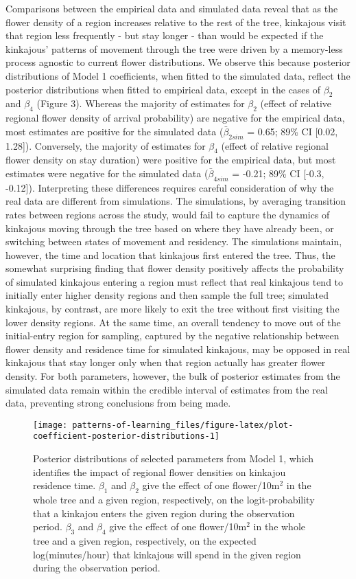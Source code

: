 \documentclass[twoside,12pt,final]{ucthesis-CA2012}
\begin{document}
\begin{ucmainmatter}
Comparisons between the empirical data and simulated data reveal that as the flower density of a region increases relative to the rest of the tree, kinkajous visit that region less frequently - but stay longer - than would be expected if the kinkajous' patterns of movement through the tree were driven by a memory-less process agnostic to current flower distributions. We observe this because posterior distributions of Model 1 coefficients, when fitted to the simulated data, reflect the posterior distributions when fitted to empirical data, except in the cases of \(\beta_2\) and \(\beta_4\) (Figure 3). Whereas the majority of estimates for \(\beta_2\) (effect of relative regional flower density of arrival probability) are negative for the empirical data, most estimates are positive for the simulated data (\(\bar\beta_{2sim}\) = 0.65; 89\% CI {[}0.02, 1.28{]}). Conversely, the majority of estimates for \(\beta_4\) (effect of relative regional flower density on stay duration) were positive for the empirical data, but most estimates were negative for the simulated data (\(\bar\beta_{4sim}\) = -0.21; 89\% CI {[}-0.3, -0.12{]}). Interpreting these differences requires careful consideration of why the real data are different from simulations. The simulations, by averaging transition rates between regions across the study, would fail to capture the dynamics of kinkajous moving through the tree based on where they have already been, or switching between states of movement and residency. The simulations maintain, however, the time and location that kinkajous first entered the tree. Thus, the somewhat surprising finding that flower density positively affects the probability of simulated kinkajous entering a region must reflect that real kinkajous tend to initially enter higher density regions and then sample the full tree; simulated kinkajous, by contrast, are more likely to exit the tree without first visiting the lower density regions. At the same time, an overall tendency to move out of the initial-entry region for sampling, captured by the negative relationship between flower density and residence time for simulated kinkajous, may be opposed in real kinkajous that stay longer only when that region actually has greater flower density. For both parameters, however, the bulk of posterior estimates from the simulated data remain within the credible interval of estimates from the real data, preventing strong conclusions from being made.
\begin{figure}
\texttt{[image: patterns-of-learning\_files/figure-latex/plot-coefficient-posterior-distributions-1]} \caption[Posterior distributions of selected parameters from Model 1]{Posterior distributions of selected parameters from Model 1, which identifies the impact of regional flower densities on kinkajou residence time. $\beta_1$ and $\beta_2$ give the effect of one flower/10m$^2$ in the whole tree and a given region, respectively, on the logit-probability that a kinkajou enters the given region during the observation period. $\beta_3$ and $\beta_4$ give the effect of one flower/10m$^2$ in the whole tree and a given region, respectively, on the expected log(minutes/hour) that kinkajous will spend in the given region during the observation period.}\label{fig:plot-coefficient-posterior-distributions}

\end{figure}
\end{ucmainmatter}
\end{document}
